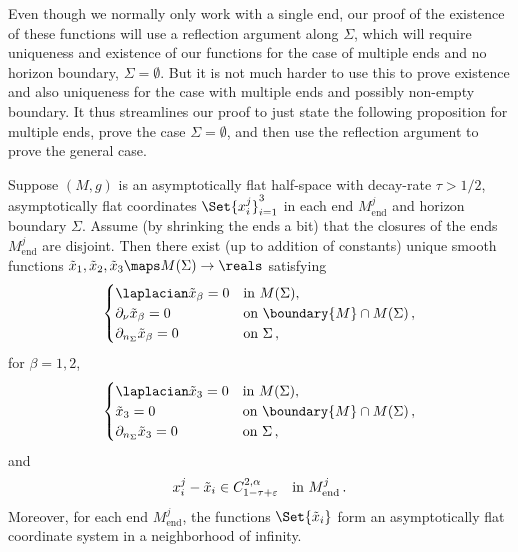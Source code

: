 \documentclass[titlepage,numbers=noenddot,oneside,%
cleardoublepage=empty,paper=a4,fontsize=11pt,%
english,%
]{scrartcl}
\newcommand*{\mathcomma}{\,,}
\newcommand*{\mathfullstop}{\,.}
\newcommand{\Mend}{M_{\mathrm{end}}} %
\begin{document}

Even though we normally only work with a single end, our proof of the existence of these functions will use a reflection argument along \( \Sigma \), which will require uniqueness and existence of our functions for the case of multiple ends and no horizon boundary, \ie \( \Sigma=\emptyset \). But it is not much harder to use this to prove existence and also uniqueness for the case with multiple ends and possibly non-empty boundary. It thus streamlines our proof to just state the following proposition for multiple ends, prove the case \( \Sigma=\emptyset \), and then use the reflection argument to prove the general case.
\begin{proposition}\label{prop:existence_and_uniqueness}
    Suppose \( (M,g) \) is an asymptotically flat half-space with decay-rate \( \tau>1/2 \), asymptotically flat coordinates \( \Set{x_i^j}_{i=1}^3 \) in each end \( \Mend^j \) and horizon boundary \( \Sigma \). Assume (\eg by shrinking the ends a bit) that the closures of the ends \( \Mend^j \) are disjoint. Then there exist (up to addition of constants) unique smooth functions \( \tilde{x}_1,\tilde{x}_2,\tilde{x}_3\maps M(\Sigma)\to \reals \) satisfying
    \begin{equation*}
        \begin{cases}
            \laplacian \tilde{x}_\beta=0& \text{in \( M(\Sigma) \)},\\
            \partial_\nu \tilde{x}_\beta=0& \text{on \( \boundary{M}\cap M(\Sigma) \)}\mathcomma\\
            \partial_{n_\Sigma}\tilde{x}_\beta=0&\text{on \( \Sigma \)}\mathcomma
        \end{cases}
    \end{equation*}
    for \( \beta=1,2 \),
    \begin{equation*}
        \begin{cases}
            \laplacian \tilde{x}_3=0& \text{in \( M(\Sigma) \)},\\
            \tilde{x}_3=0& \text{on \( \boundary{M}\cap M(\Sigma) \)}\mathcomma\\
            \partial_{n_{\Sigma}}\tilde{x}_3=0& \text{on \( \Sigma \)}\mathcomma
        \end{cases}
    \end{equation*}
    and
    \begin{equation*}
        x_i^j-\tilde{x}_i\in C_{1-\tau+\varepsilon}^{2,\alpha} \quad \text{in \( \Mend^j \)}\mathfullstop
    \end{equation*}
    Moreover, for each end \( \Mend^j \), the functions \( \Set{\tilde{x}_i} \) form an asymptotically flat coordinate system in a neighborhood of infinity.
\end{proposition} 
\end{document}
